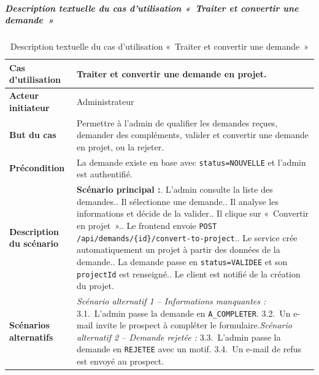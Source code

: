 \subparagraph{Description textuelle du cas d'utilisation «~Traiter et convertir une demande~»}

\begin{table}[H]
  \caption{Description textuelle du cas d'utilisation «~Traiter et convertir une demande~»}
  \label{tab:cu-traiter-demande}
  \centering
  \begin{tabularx}{\textwidth}{|L{3.8cm}|X|}
    \hline
    \textbf{Cas d'utilisation} & Traiter et convertir une demande en projet. \\
    \hline
    \textbf{Acteur initiateur} & Administrateur \\
    \hline
    \textbf{But du cas} & Permettre à l'admin de qualifier les demandes reçues, demander des compléments, valider et convertir une demande en projet, ou la rejeter. \\
    \hline
    \textbf{Précondition} & La demande existe en base avec \texttt{status=NOUVELLE} et l'admin est authentifié. \\
    \hline
    \textbf{Description du scénario} &
    \textbf{Scénario principal :}. L'admin consulte la liste des demandes.. Il sélectionne une demande.. Il analyse les informations et décide de la valider.. Il clique sur «~Convertir en projet~».. Le frontend envoie \texttt{POST /api/demands/\{id\}/convert-to-project}.. Le service crée automatiquement un projet à partir des données de la demande.. La demande passe en \texttt{status=VALIDEE} et son \texttt{projectId} est renseigné.. Le client est notifié de la création du projet.\\
    \hline
    \textbf{Scénarios alternatifs} &
    \textit{Scénario alternatif 1 -- Informations manquantes :}\newline
    \hspace*{6pt}3.1.~L'admin passe la demande en \texttt{A\_COMPLETER}.\newline
    \hspace*{6pt}3.2.~Un e-mail invite le prospect à compléter le formulaire.\newline[2pt]
    \textit{Scénario alternatif 2 -- Demande rejetée :}\newline
    \hspace*{6pt}3.3.~L'admin passe la demande en \texttt{REJETEE} avec un motif.\newline
    \hspace*{6pt}3.4.~Un e-mail de refus est envoyé au prospect.\\
    \hline
  \end{tabularx}
\end{table}

